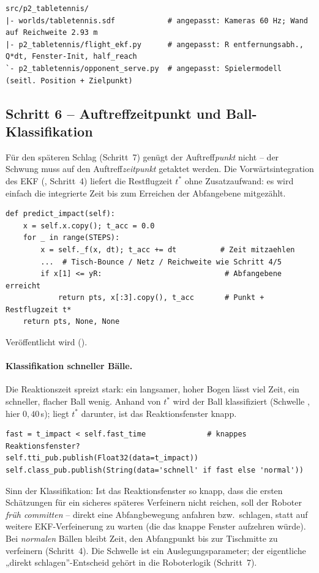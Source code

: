 \begin{lstlisting}[style=bash,caption={\code{ros2\_ws}-Delta dieser Verfeinerung (\# angepasst)}]
src/p2_tabletennis/
|- worlds/tabletennis.sdf            # angepasst: Kameras 60 Hz; Wand auf Reichweite 2.93 m
|- p2_tabletennis/flight_ekf.py      # angepasst: R entfernungsabh., Q*dt, Fenster-Init, half_reach
`- p2_tabletennis/opponent_serve.py  # angepasst: Spielermodell (seitl. Position + Zielpunkt)
\end{lstlisting}

\subsection{Schritt 6 -- Auftreffzeitpunkt und Ball-Klassifikation}
\label{sec:schritt6-zeit}
Für den späteren Schlag (Schritt~7) genügt der Auftreff\emph{punkt} nicht -- der
Schwung muss auf den Auftreff\emph{zeitpunkt} getaktet werden. Die
Vorwärtsintegration des EKF (, Schritt~4) liefert die
Restflugzeit $t^\ast$ ohne Zusatzaufwand: es wird einfach die integrierte Zeit bis
zum Erreichen der Abfangebene mitgezählt.
\begin{lstlisting}[style=py,caption={\code{flight\_ekf} -- Restflugzeit $t^\ast$ aus der Vorhersage}]
def predict_impact(self):
    x = self.x.copy(); t_acc = 0.0
    for _ in range(STEPS):
        x = self._f(x, dt); t_acc += dt          # Zeit mitzaehlen
        ...  # Tisch-Bounce / Netz / Reichweite wie Schritt 4/5
        if x[1] <= yR:                            # Abfangebene erreicht
            return pts, x[:3].copy(), t_acc       # Punkt + Restflugzeit t*
    return pts, None, None
\end{lstlisting}
\noindent Veröffentlicht wird  ().

\paragraph{Klassifikation schneller Bälle.} Die Reaktionszeit spreizt stark: ein
langsamer, hoher Bogen lässt viel Zeit, ein schneller, flacher Ball wenig. Anhand
von $t^\ast$ wird der Ball klassifiziert (Schwelle , hier
$0{,}40\,$s); liegt $t^\ast$ darunter, ist das Reaktionsfenster knapp.
\begin{lstlisting}[style=py,caption={\code{flight\_ekf} -- Ball-Klassifikation (schnell/normal)}]
fast = t_impact < self.fast_time              # knappes Reaktionsfenster?
self.tti_pub.publish(Float32(data=t_impact))
self.class_pub.publish(String(data='schnell' if fast else 'normal'))
\end{lstlisting}
\noindent Sinn der Klassifikation: Ist das Reaktionsfenster so knapp, dass die
ersten Schätzungen für ein sicheres späteres Verfeinern nicht reichen, soll der
Roboter \emph{früh committen} -- direkt eine Abfangbewegung anfahren bzw.\ schlagen,
statt auf weitere EKF-Verfeinerung zu warten (die das knappe Fenster aufzehren
würde). Bei \emph{normalen} Bällen bleibt Zeit, den Abfangpunkt bis zur Tischmitte
zu verfeinern (Schritt~4). Die Schwelle ist ein Auslegungsparameter; der eigentliche
„direkt schlagen''-Entscheid gehört in die Roboterlogik (Schritt~7).

